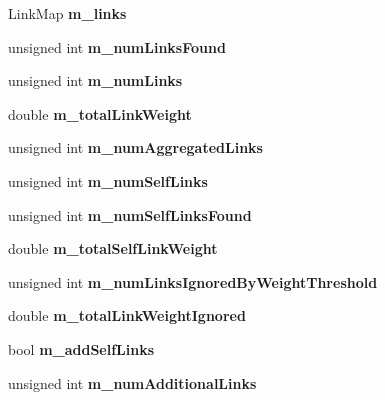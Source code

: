 \begin{DoxyCompactItemize}
Link\+Map {\bfseries m\+\_\+links}
\item 
\mbox{\label{classNetwork_ab7c780d54802ce7e157809aa8845b987}} 
unsigned int {\bfseries m\+\_\+num\+Links\+Found}
\item 
\mbox{\label{classNetwork_a36519dd304e83f04ecb94acf4fcd5c94}} 
unsigned int {\bfseries m\+\_\+num\+Links}
\item 
\mbox{\label{classNetwork_a9318381e49235c2e97e4712a48558f4b}} 
double {\bfseries m\+\_\+total\+Link\+Weight}
\item 
\mbox{\label{classNetwork_ae75baccb62375113dfdfbfeb4632c9d8}} 
unsigned int {\bfseries m\+\_\+num\+Aggregated\+Links}
\item 
\mbox{\label{classNetwork_add43682b04697124c2037a877c75569e}} 
unsigned int {\bfseries m\+\_\+num\+Self\+Links}
\item 
\mbox{\label{classNetwork_a5a261b839d65cc6f451b89331b81cfe4}} 
unsigned int {\bfseries m\+\_\+num\+Self\+Links\+Found}
\item 
\mbox{\label{classNetwork_aefa3790d78ab7b69a0bdb764d3e832ed}} 
double {\bfseries m\+\_\+total\+Self\+Link\+Weight}
\item 
\mbox{\label{classNetwork_a57fbd8f3f1b0d134a978a75284a1f415}} 
unsigned int {\bfseries m\+\_\+num\+Links\+Ignored\+By\+Weight\+Threshold}
\item 
\mbox{\label{classNetwork_a709c9d7e3a4d27bfe4ac20ce322ef8e9}} 
double {\bfseries m\+\_\+total\+Link\+Weight\+Ignored}
\item 
\mbox{\label{classNetwork_ab76c0603719b376a0ea1ed7653725bc6}} 
bool {\bfseries m\+\_\+add\+Self\+Links}
\item 
\mbox{\label{classNetwork_a56f2ad06a21236bfdbd0c97cacbfbefa}} 
unsigned int {\bfseries m\+\_\+num\+Additional\+Links}
\item 
\mbox{\label{classNetwork_a4bc3ebc1347d25d3ea6d81d858d7b670}} 

\end{DoxyCompactItemize}
